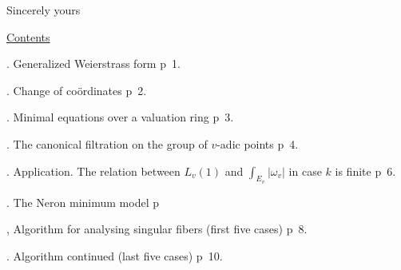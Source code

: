 \noindent\hspace*{1cm}Sincerely yours\hfill{}\par

\begin{center}\uline{Contents}\end{center}

. Generalized Weierstrass form \qquad p~1.

. Change of coördinates \qquad p~2.

. Minimal  equations over a valuation ring \qquad p~3.

. The canonical filtration on the group of $v$-adic points \qquad p~4.

. Application. The relation between $L_v(1)$ and $\int_{E_v}|\omega_v|$ in case $k$ is finite \qquad p~6.

. The Neron minimum model \qquad p~

, Algorithm for analysing singular fibers \quad (first five cases) \qquad p~8.

. Algorithm continued \quad (last five cases) \qquad p~10.

